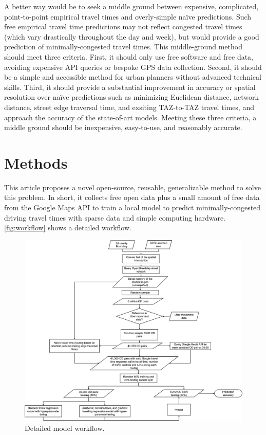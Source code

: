 \documentclass[12pt,letterpaper]{article} %
\begin{document}
A better way would be to seek a middle ground between expensive, complicated, point-to-point empirical travel times and overly-simple naïve predictions. Such free empirical travel time predictions may not reflect congested travel times (which vary drastically throughout the day and week), but would provide a good prediction of minimally-congested travel times. This middle-ground method should meet three criteria. First, it should only use free software and free data, avoiding expensive API queries or bespoke GPS data collection. Second, it should be a simple and accessible method for urban planners without advanced technical skills. Third, it should provide a substantial improvement in accuracy or spatial resolution over naïve predictions such as minimizing Euclidean distance, network distance, street edge traversal time, and exsiting TAZ-to-TAZ travel times, and approach the accuracy of the state-of-art models. Meeting these three criteria, a middle ground should be inexpensive, easy-to-use, and reasonably accurate.

\section{Methods}

This article proposes a novel open-source, reusable, generalizable method to solve this problem. In short, it collects free open data plus a small amount of free data from the Google Maps API to train a local model to predict minimally-congested driving travel times with sparse data and simple computing hardware. \autoref{fig:workflow} shows a detailed workflow.

\begin{figure}[bt!]
    \centering
    \includegraphics[width=1.0\textwidth]{fig_workflow.jpg}
    \caption{Detailed model workflow.}\label{fig:workflow}
\end{figure}
\end{document}
